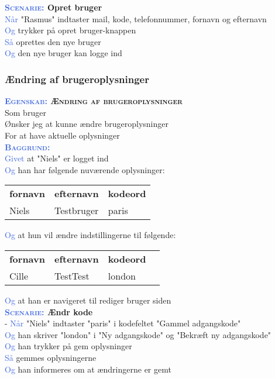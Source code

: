 \textbf{\textsc{\textcolor{RoyalBlue}{Scenarie:}} Opret bruger}\\
\textcolor{RoyalBlue}{Når} "Rasmus" indtaster mail, kode, telefonnummer, 
fornavn og efternavn \\
\textcolor{RoyalBlue}{Og} trykker på opret bruger-knappen\\
\textcolor{RoyalBlue}{Så} oprettes den nye bruger\\
\textcolor{RoyalBlue}{Og} den nye bruger kan logge ind\\


\subsubsection{Ændring af brugeroplysninger}
\textbf{\textsc{\textcolor{RoyalBlue}{Egenskab:} Ændring af brugeroplysninger}}\\
Som bruger\\
Ønsker jeg at kunne ændre brugeroplysninger\\
For at have aktuelle oplysninger\\

\textsc{\textcolor{RoyalBlue}{\textbf{Baggrund:}}}\\
\textcolor{RoyalBlue}{Givet} at "Niels" er logget ind\\
\textcolor{RoyalBlue}{Og} han har følgende nuværende oplysninger:\\
\begin{tabular}{| l | l | l |}
	\textbf{fornavn} & \textbf{efternavn} & \textbf{kodeord} \\
	Niels & Testbruger & paris \\
\end{tabular}
\newline \newline
\textcolor{RoyalBlue}{Og} at hun vil ændre indstillingerne til følgende:\\
\begin{tabular}{| l | l | l | l |}
	\textbf{fornavn} & \textbf{efternavn} & \textbf{kodeord} \\
	Cille & TestTest & london \\
\end{tabular}
\newline \newline
\textcolor{RoyalBlue}{Og} at han er navigeret til rediger bruger siden\\

\textbf{\textsc{\textcolor{RoyalBlue}{Scenarie:}} Ændr kode}\\-
\textcolor{RoyalBlue}{Når} "Niels" indtaster "paris" i kodefeltet "Gammel adgangskode"\\
\textcolor{RoyalBlue}{Og} han skriver "london" i "Ny adgangskode" og "Bekræft ny adgangskode"\\
\textcolor{RoyalBlue}{Og} han trykker på gem oplysninger\\
\textcolor{RoyalBlue}{Så} gemmes oplysningerne\\
\textcolor{RoyalBlue}{Og} han informeres om at ændringerne er gemt\\

